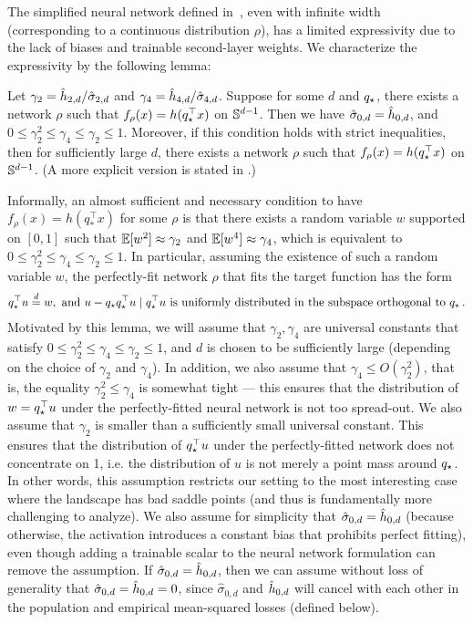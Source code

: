 The simplified neural network defined in~, even with infinite width (corresponding to a continuous distribution $\rho$), has a limited expressivity due to the lack of biases and trainable second-layer weights. We characterize the expressivity by the following lemma:

\begin{lemma}[Expressivity]\label{lem:expressivity}
Let $\gamma_2 = \hat{h}_{2,d}/\hat{\sigma}_{2, d}$ and $\gamma_4 = \hat{h}_{4,d}/\hat{\sigma}_{4, d}$. Suppose for some $d$ and $q_\star$, there exists a network $\rho$ such that $f_\rho(x) = h(q_\star^\top x)$ on $\mathbb{S}^{d-1}$. Then we have $\hat{\sigma}_{0,d} = \hat{h}_{0,d}$, and $
0 \le \gamma_2^2 \le \gamma_4 \le \gamma_2 \le 1.
$ Moreover, if this condition holds with strict inequalities, then for sufficiently large $d$, there exists a network $\rho$ such that $f_\rho(x) = h(q_\star^\top x)$ on $\mathbb{S}^{d - 1}$. (A more explicit version is stated in .)\end{lemma}
Informally, an almost sufficient and necessary condition to have $f_\rho(x) = h(q_*^\top x)$ for some $\rho$ is that there exists a random variable $w$ supported on $[0,1]$ such that $\operatorname*{\mathbb{E}}[w^2]\approx \gamma_2$ and $\operatorname*{\mathbb{E}}[w^4]\approx \gamma_4$, which is equivalent to $0 \le \gamma_2^2 \le \gamma_4 \le \gamma_2 \le 1.$ 
In particular, assuming the existence of such a random variable $w$, the perfectly-fit network $\rho$ that fits the target function has the form 
\begin{align}
q_\star^\top u \overset{d}{=} w, \textup{ and $u - q_\star q_\star^\top u \mid q_\star^\top u$ is uniformly distributed in the subspace orthogonal to $q_\star$} \,.
\end{align}
Motivated by this lemma, we will assume that $\gamma_2, \gamma_4$ are universal constants that satisfy $0 \le \gamma_2^2 \le \gamma_4 \le \gamma_2 \le 1$, and $d$ is chosen to be sufficiently large (depending on the choice of $\gamma_2$ and $\gamma_4$). In addition, we also assume that $\gamma_4 \leq O(\gamma_2^2)$, that is, the equality $\gamma_2^2 \le \gamma_4$ is somewhat tight --- this ensures that the distribution of $w = q_\star^\top u$ under the perfectly-fitted neural network is not too spread-out.  We also assume that $\gamma_2$ is smaller than a sufficiently small universal constant. This ensures that the distribution of $q_\star^\top u$ under the perfectly-fitted network does not concentrate on  1, i.e. the distribution of $u$ is not merely a point mass around $q_\star$. In other words, this assumption restricts our setting to the most interesting case where the landscape has bad saddle points (and thus is fundamentally more challenging to analyze). We also assume for simplicity that $\hat{\sigma}_{0,d} = \hat{h}_{0,d}$ (because otherwise, the activation introduces a constant bias that prohibits perfect fitting), even though adding a trainable scalar to the neural network formulation can remove the assumption. If $\hat{\sigma}_{0, d} = \hat{h}_{0, d}$, then we can assume without loss of generality that $\hat{\sigma}_{0, d} = \hat{h}_{0, d} = 0$, since $\hat{\sigma}_{0, d}$ and $\hat{h}_{0, d}$ will cancel with each other in the population and empirical mean-squared losses (defined below).
